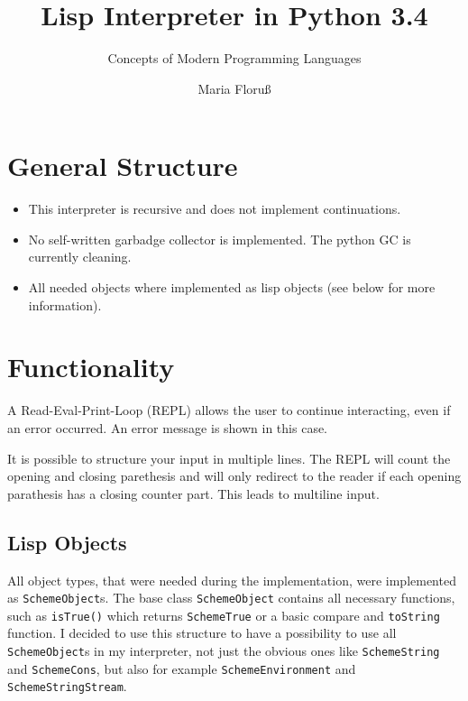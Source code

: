 \documentclass[12pt,a4paper]{scrartcl}
\begin{document}
\title{Lisp Interpreter in Python 3.4}
\subtitle{Concepts of Modern Programming Languages}
\author{Maria Floru\ss}
\maketitle
\newpage

\section*{General Structure}
\begin{itemize}
\item This interpreter is recursive and does not implement continuations. 
\item No self-written garbadge collector is implemented. The python GC is currently cleaning.
\item All needed objects where implemented as lisp objects (see below for more information).
\end{itemize}


\section*{Functionality}
A Read-Eval-Print-Loop (REPL) allows the user to continue interacting, even if an error occurred. An error message is shown in this case.

It is possible to structure your input in multiple lines. The REPL will count the opening and closing parethesis and will only redirect to the reader if each opening parathesis has a closing counter part. This leads to multiline input.


\subsection*{Lisp Objects}
All object types, that were needed during the implementation, were implemented as \lstinline{SchemeObject}s. The base class \lstinline{SchemeObject} contains all necessary functions, such as \lstinline{isTrue()} which returns \lstinline{SchemeTrue} or a basic compare and \lstinline{toString} function. I decided to use this structure to have a possibility to use all \lstinline{SchemeObject}s in my interpreter, not just the obvious ones like \lstinline{SchemeString} and \lstinline{SchemeCons}, but also for example \lstinline{SchemeEnvironment} and \lstinline{SchemeStringStream}. 
\end{document}
